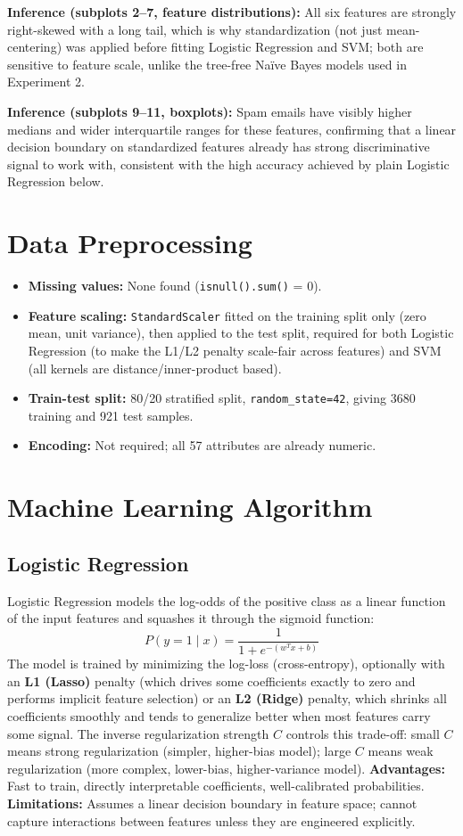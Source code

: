 \documentclass[12pt,a4paper]{article}
\begin{document}
\textbf{Inference (subplots 2--7, feature distributions):} All six features are strongly
right-skewed with a long tail, which is why standardization (not just mean-centering) was
applied before fitting Logistic Regression and SVM; both are sensitive to feature scale,
unlike the tree-free Na\"ive Bayes models used in Experiment 2.

\textbf{Inference (subplots 9--11, boxplots):} Spam emails have visibly higher medians
and wider interquartile ranges for these features, confirming that a linear decision
boundary on standardized features already has strong discriminative signal to work with,
consistent with the high accuracy achieved by plain Logistic Regression below.

\section{Data Preprocessing}
\begin{itemize}
\item \textbf{Missing values:} None found (\texttt{isnull().sum()} = 0).
\item \textbf{Feature scaling:} \texttt{StandardScaler} fitted on the training split only
(zero mean, unit variance), then applied to the test split, required for both Logistic
Regression (to make the L1/L2 penalty scale-fair across features) and SVM (all kernels
are distance/inner-product based).
\item \textbf{Train-test split:} 80/20 stratified split, \texttt{random\_state=42}, giving
3680 training and 921 test samples.
\item \textbf{Encoding:} Not required; all 57 attributes are already numeric.
\end{itemize}

\section{Machine Learning Algorithm}

\subsection*{Logistic Regression}
Logistic Regression models the log-odds of the positive class as a linear function of
the input features and squashes it through the sigmoid function:
\[
P(y=1\mid x) = \frac{1}{1+e^{-(w^Tx+b)}}
\]
The model is trained by minimizing the log-loss (cross-entropy), optionally with an
\textbf{L1 (Lasso)} penalty (which drives some coefficients exactly to zero and
performs implicit feature selection) or an \textbf{L2 (Ridge)} penalty, which shrinks
all coefficients smoothly and tends to generalize better when most features carry some
signal. The inverse regularization strength $C$ controls this trade-off: small $C$ means
strong regularization (simpler, higher-bias model); large $C$ means weak regularization
(more complex, lower-bias, higher-variance model).
\textbf{Advantages:} Fast to train, directly interpretable coefficients, well-calibrated
probabilities. \textbf{Limitations:} Assumes a linear decision boundary in feature space;
cannot capture interactions between features unless they are engineered explicitly.
\end{document}
